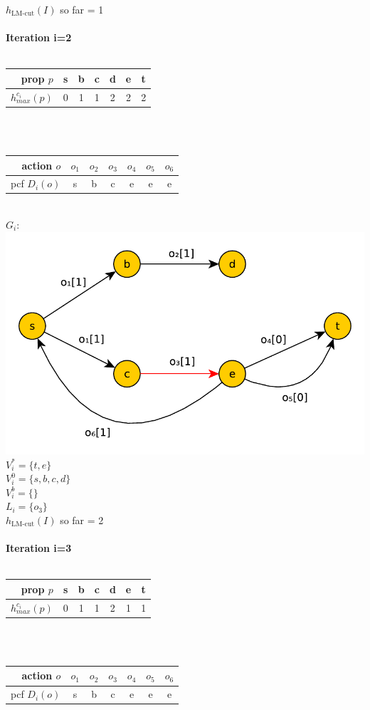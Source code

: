 \documentclass[11pt,a4paper]{article}
\begin{document}
$h_{\text{LM-cut}}(I)$ so far = 1\\
\\
\textbf{Iteration i=2}\\
\\
\begin{tabular}{r|cccccc}
prop $p$ & s & b & c & d & e & t\\
\hline
$h^{c_i}_{max}(p)$ & 0 & 1 & 1 & 2 & 2 & 2
\end{tabular}\\
\\
\begin{tabular}{r|cccccc}
action $o$ & $o_1$ & $o_2$ & $o_3$ & $o_4$ & $o_5$ & $o_6$\\
\hline
pcf $D_i(o)$ & s & b & c & e & e & e
\end{tabular}\\
\newpage
$G_i:$\\
\includegraphics[scale=0.5]{jugraph2}\\
$V^*_i=\{t,e\}$\\
$V^0_i=\{s,b,c,d\}$\\
$V^b_i=\{\}$\\
$L_i=\{o_3\}$\\
$h_{\text{LM-cut}}(I)$ so far = 2\\
\\
\textbf{Iteration i=3}\\
\\
\begin{tabular}{r|cccccc}
prop $p$ & s & b & c & d & e & t\\
\hline
$h^{c_i}_{max}(p)$ & 0 & 1 & 1 & 2 & 1 & 1
\end{tabular}\\
\\
\begin{tabular}{r|cccccc}
action $o$ & $o_1$ & $o_2$ & $o_3$ & $o_4$ & $o_5$ & $o_6$\\
\hline
pcf $D_i(o)$ & s & b & c & e & e & e
\end{tabular}\\
\end{document}
